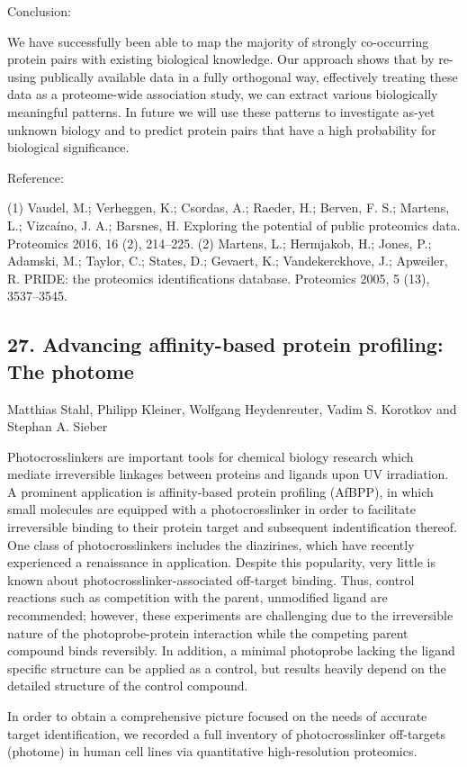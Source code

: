 Conclusion:

We have successfully been able to map the majority of strongly co-occurring protein pairs with existing biological knowledge. Our approach shows that by re-using publically available data in a fully orthogonal way, effectively treating these data as a proteome-wide association study, we can extract various biologically meaningful patterns. In future we will use these patterns to investigate as-yet unknown biology and to predict protein pairs that have a high probability for biological significance.

Reference:

(1) Vaudel, M.; Verheggen, K.; Csordas, A.; Raeder, H.; Berven, F. S.; Martens, L.; Vizcaíno, J. A.; Barsnes, H. Exploring the potential of public proteomics data. Proteomics 2016, 16 (2), 214–225.
(2) Martens, L.; Hermjakob, H.; Jones, P.; Adamski, M.; Taylor, C.; States, D.; Gevaert, K.; Vandekerckhove, J.; Apweiler, R. PRIDE: the proteomics identifications database. Proteomics 2005, 5 (13), 3537–3545.

\subsection*{\color{eubicRed} 27. Advancing affinity-based protein profiling: The photome}
{\color{eubicGray}Matthias Stahl, Philipp Kleiner, Wolfgang Heydenreuter, Vadim S. Korotkov and Stephan A. Sieber}

Photocrosslinkers are important tools for chemical biology research which mediate irreversible linkages between proteins and ligands upon UV irradiation. A prominent application is affinity-based protein profiling (AfBPP), in which small molecules are equipped with a photocrosslinker in order to facilitate irreversible binding to their protein target and subsequent indentification thereof. One class of photocrosslinkers includes the diazirines, which have recently experienced a renaissance in application. Despite this popularity, very little is known about photocrosslinker-associated off-target binding. Thus, control reactions such as competition with the parent, unmodified ligand are recommended; however, these experiments are challenging due to the irreversible nature of the photoprobe-protein interaction while the competing parent compound binds reversibly. In addition, a minimal photoprobe lacking the ligand specific structure can be applied as a control, but results heavily depend on the detailed structure of the control compound.

In order to obtain a comprehensive picture focused on the needs of accurate target identification, we recorded a full inventory of photocrosslinker off-targets (photome) in human cell lines via quantitative high-resolution proteomics.


